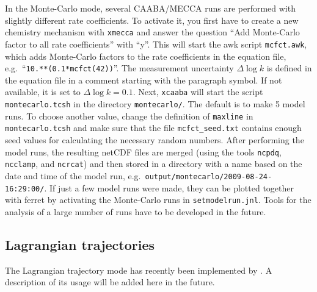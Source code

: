\documentclass[twoside]{article}
\begin{document}
In the Monte-Carlo mode, several CAABA/MECCA runs are performed with
slightly different rate coefficients. To activate it, you first have to
create a new chemistry mechanism with \verb|xmecca| and answer the
question ``Add Monte-Carlo factor to all rate coefficients'' with ``y''.
This will start the awk script \verb|mcfct.awk|, which adds Monte-Carlo
factors to the rate coefficients in the equation file, e.g.\
``\verb|10.**(0.1*mcfct(42))|''. The measurement uncertainty $\Delta\log
k$ is defined in the equation file in a comment starting with the
paragraph symbol. If not available, it is set to $\Delta\log k = 0.1$.
Next, \verb|xcaaba| will start the script \verb|montecarlo.tcsh| in the
directory \verb|montecarlo/|. The default is to make 5 model runs. To
choose another value, change the definition of \verb|maxline| in
\verb|montecarlo.tcsh| and make sure that the file \verb|mcfct_seed.txt|
contains enough seed values for calculating the necessary random
numbers. After performing the model runs, the resulting netCDF files are
merged (using the tools \verb|ncpdq|, \verb|ncclamp|, and \verb|ncrcat|)
and then stored in a directory with a name based on the date and time of
the model run, e.g.\ \verb|output/montecarlo/2009-08-24-16:29:00/|. If
just a few model runs were made, they can be plotted together with
ferret by activating the Monte-Carlo runs in \verb|setmodelrun.jnl|.
Tools for the analysis of a large number of runs have to be developed in
the future.

\subsection{Lagrangian trajectories}
\label{sec:lagrangian}

The Lagrangian trajectory mode has recently been implemented by
\citet{2403}. A description of its usage will be added here in the
future. %
\end{document}
